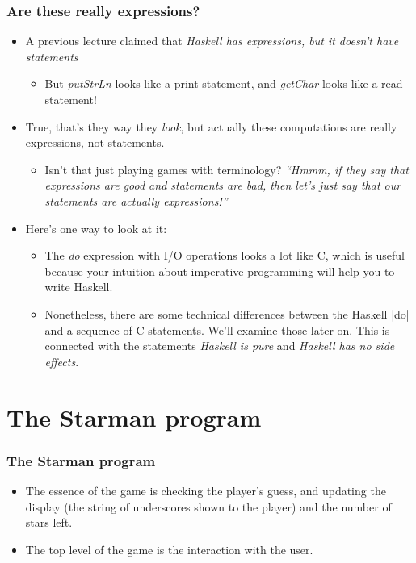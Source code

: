 \documentclass{beamer}
\begin{document}
\begin{frame}[fragile]
\frametitle{Are these really expressions?}

\begin{itemize}
\item A previous lecture claimed that \emph{Haskell has
    expressions, but it doesn't have statements}
  \begin{itemize}
  \item {\redtext But \emph{putStrLn} looks like a print statement, and \emph{getChar}
    looks like a read statement!}
  \end{itemize}
\item True, that's they way they \emph{look}, but actually these
  computations are really expressions, not statements.
  \begin{itemize}
  \item {\redtext Isn't that just playing games with terminology?
    \emph{``Hmmm, if they say that expressions are good and
      statements are bad, then let's just say that our statements
      are actually expressions!''}}
  \end{itemize}
\item Here's one way to look at it:
  \begin{itemize}
  \item The \emph{do} expression with I/O operations looks a lot like C,
    which is useful because {\bluetext your intuition about
      imperative programming will help you to write Haskell.}
  \item Nonetheless, there are some {\bluetext technical
      differences between the Haskell |do| and a sequence of C
      statements.}  We'll examine those later on.  This is
    connected with the statements \emph{\redtext Haskell is pure}
    and \emph{\redtext Haskell has no side effects}.
  \end{itemize}
\end{itemize}

\end{frame}
\section{The Starman program}

\begin{frame}[fragile]
\frametitle{The Starman program}

\begin{itemize}
\item The essence of the game is checking the player's guess, and
  updating the display (the string of underscores shown to the
  player) and the number of stars left.
\item The top level of the game is the interaction with the user.
\end{itemize}

\end{frame}
\end{document}
